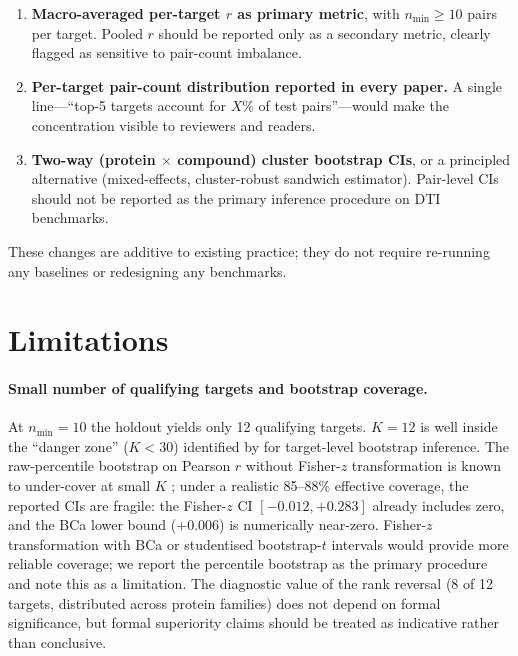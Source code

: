 \documentclass[11pt,a4paper]{article}
\begin{document}
\begin{enumerate}
  \item \textbf{Macro-averaged per-target $r$ as primary metric}, with
    $n_\text{min} \geq 10$ pairs per target.
    Pooled $r$ should be reported only as a secondary metric, clearly flagged
    as sensitive to pair-count imbalance.
  \item \textbf{Per-target pair-count distribution reported in every paper.}
    A single line---``top-5 targets account for $X\%$ of test pairs''---would
    make the concentration visible to reviewers and readers.
  \item \textbf{Two-way (protein $\times$ compound) cluster bootstrap CIs}, or
    a principled alternative (mixed-effects, cluster-robust sandwich
    estimator).
    Pair-level CIs should not be reported as the primary inference procedure on
    DTI benchmarks.
\end{enumerate}

These changes are additive to existing practice; they do not require
re-running any baselines or redesigning any benchmarks.

\section{Limitations}

\paragraph{Small number of qualifying targets and bootstrap coverage.}
At $n_\text{min} = 10$ the holdout yields only 12 qualifying targets.
$K = 12$ is well inside the ``danger zone'' ($K < 30$) identified by
\citet{cameron2015practitioner} for target-level bootstrap inference.
The raw-percentile bootstrap on Pearson $r$ without Fisher-$z$ transformation
is known to under-cover at small $K$ \citep{mackinnon2023fast}; under a
realistic 85--88\% effective coverage, the reported CIs are fragile: the
Fisher-$z$ CI $[-0.012, +0.283]$ already includes zero, and the BCa lower
bound ($+0.006$) is numerically near-zero.
Fisher-$z$ transformation with BCa or studentised bootstrap-$t$ intervals
\citep{mackinnon2023fast} would provide more reliable coverage;
we report the percentile bootstrap as the primary procedure and note this
as a limitation.
The diagnostic value of the rank reversal (8 of 12 targets, distributed
across protein families) does not depend on formal significance, but formal
superiority claims should be treated as indicative rather than conclusive.
\end{document}
